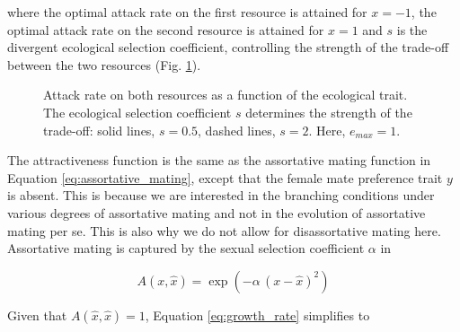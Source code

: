 where the optimal attack rate on the first resource is attained for $x = -1$, the optimal attack rate on the second resource is attained for $x = 1$ and $s$ is the divergent ecological selection coefficient, controlling the strength of the trade-off between the two resources (Fig. \ref{fig:attack_rates}).\\

\begin{figure}
    \begin{center}
        \end{center}
    \label{fig:attack_rates}
    \caption{Attack rate on both resources as a function of the ecological trait. The ecological selection coefficient $s$ determines the strength of the trade-off: solid lines, $s = 0.5$, dashed lines, $s = 2$. Here, $e_{max} = 1$.}
\end{figure}

The attractiveness function is the same as the assortative mating function in Equation \ref{eq:assortative_mating}, except that the female mate preference trait $y$ is absent. This is because we are interested in the branching conditions under various degrees of assortative mating and not in the evolution of assortative mating per se. This is also why we do not allow for disassortative mating here. Assortative mating is captured by the sexual selection coefficient $\alpha$ in

\begin{equation}
    A(x, \hat{x}) = \exp{(-\alpha \, (x - \hat{x})^2)}
\end{equation}



Given that $A(\hat{x}, \hat{x}) = 1$, Equation \ref{eq:growth_rate} simplifies to

